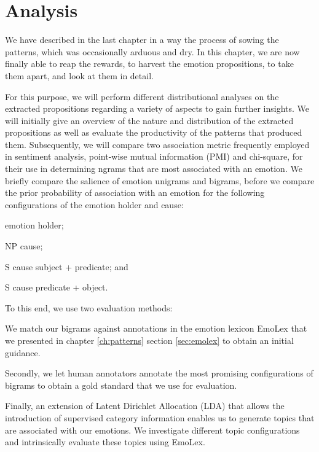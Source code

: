 
\chapter{Analysis} %

\label{ch:analysis} %

We have described in the last chapter in a way the process of sowing the patterns, which was occasionally arduous and dry. In this chapter, we are now finally able to reap the rewards, to harvest the emotion propositions, to take them apart, and look at them in detail.

For this purpose, we will perform different distributional analyses on the extracted propositions regarding a variety of aspects to gain further insights. We will initially give an overview of the nature and distribution of the extracted propositions as well as evaluate the productivity of the patterns that produced them.
Subsequently, we will compare two association metric frequently employed in sentiment analysis, point-wise mutual information (PMI) and chi-square, for their use in determining ngrams that are most associated with an emotion. We briefly compare the salience of emotion unigrams and bigrams, before we compare the prior probability of association with an emotion for the following configurations of the emotion holder and cause: \begin{inparaenum} \item emotion holder; \item NP cause; \item S cause subject + predicate; and \item S cause predicate + object. \end{inparaenum} To this end, we use two evaluation methods: \begin{inparaenum} \item We match our bigrams against annotations in the emotion lexicon EmoLex \cite{nrc_emolex} that we presented in chapter \ref{ch:patterns} section \ref{sec:emolex} to obtain an initial guidance. \item Secondly, we let human annotators annotate the most promising configurations of bigrams to obtain a gold standard that we use for evaluation. \end{inparaenum} Finally, an extension of Latent Dirichlet Allocation (LDA) that allows the introduction of supervised category information enables us to generate topics that are associated with our emotions. We investigate different topic configurations and intrinsically evaluate these topics using EmoLex.

